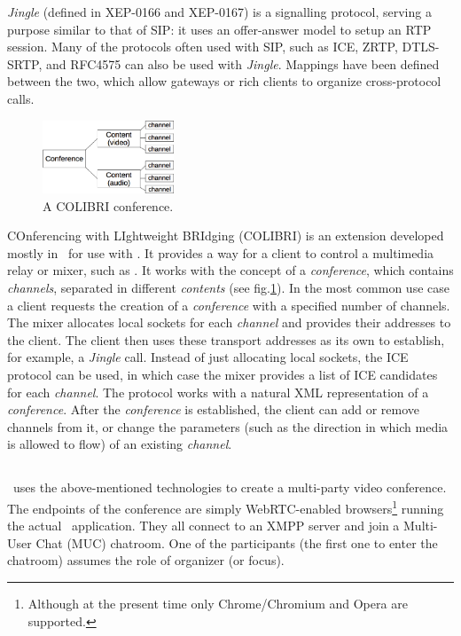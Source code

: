 \documentclass[twoside,openright,a4paper,12pt,english]{article}
\begin{document}
\emph{Jingle} (defined in XEP-0166\cite{jingle166} and XEP-0167\cite{jingle167})
is a signalling protocol, serving a purpose similar to that of SIP: it uses an
offer-answer model to setup an RTP session. Many of the
protocols often used with SIP, such as ICE\cite{ice}, ZRTP\cite{zrtp}, DTLS-SRTP\cite{rfc5763}, and
RFC4575\cite{rfc4575} can also be used with \emph{Jingle}. Mappings
have been defined between the two\cite{stoxmedia}, which allow gateways or rich
clients to organize cross-protocol calls.

\begin{figure}
   \centering
        \includegraphics[width=0.35\textwidth]{./pics/colibri-conf.eps}
        \caption{A COLIBRI conference.}
   \label{colibri-conf}
\end{figure}

COnferencing with LIghtweight BRIdging (COLIBRI\cite{colibri}) is an extension
developed mostly in \bj\ for use with \jvb. It provides a way for a client to control a multimedia
relay or mixer, such as \jvb. It works with the concept of a \emph{conference}, which contains
\emph{channels}, separated in different \emph{contents} (see fig.\ref{colibri-conf}).
In the most common use case a client requests the creation of a \emph{conference} with a specified number of
channels. The mixer allocates local sockets for each \emph{channel} and
provides their addresses to the client. The client then uses these transport
addresses as its own to establish, for example, a \emph{Jingle} call. 
Instead of just allocating local sockets, the ICE protocol can be used, in
which case the mixer provides a list of ICE candidates for each \emph{channel}.
The protocol works with a natural XML representation of a \emph{conference}.
After the \emph{conference} is established, the client can add or remove channels
from it, or change the parameters (such as the direction in which
media is allowed to flow) of an existing \emph{channel}.





\subsection{\jm}
\label{intro-jm}
\jm\ uses the above-mentioned technologies to create a multi-party video conference.
The endpoints of the conference are simply WebRTC-enabled
browsers\footnote{Although at the present time only Chrome/Chromium and Opera are
supported.} running the actual \jm\ application. They all connect to an XMPP
server and join a Multi-User Chat (MUC) chatroom. One of the participants (the
first one to enter the chatroom) assumes the role of organizer (or focus).
\end{document}
